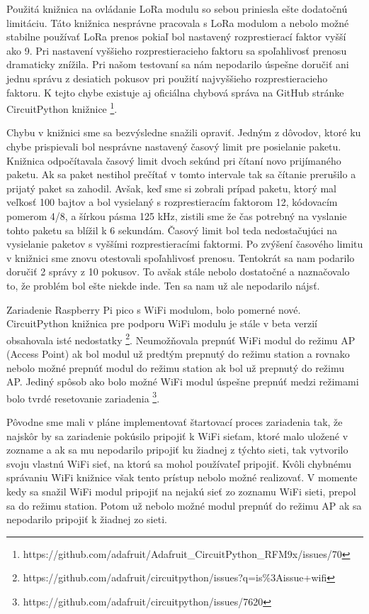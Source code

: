 \documentclass[slovak,master]{diploma}
\begin{document}
Použitá knižnica na ovládanie LoRa modulu so sebou priniesla ešte dodatočnú limitáciu. Táto knižnica nesprávne pracovala s LoRa modulom a nebolo možné stabilne používať 
LoRa prenos pokiaľ bol nastavený rozprestierací faktor vyšší ako 9. Pri nastavení vyššieho rozprestieracieho faktoru sa spoľahlivosť prenosu dramaticky znížila. Pri 
našom testovaní sa nám nepodarilo úspešne doručiť ani jednu správu z desiatich pokusov pri použití najvyššieho rozprestieracieho faktoru. 
K tejto chybe existuje aj oficiálna chybová správa na GitHub stránke CircuitPython knižnice \footnote[2]{https://github.com/adafruit/Adafruit\_CircuitPython\_RFM9x/issues/70}.

Chybu v knižnici sme sa bezvýsledne snažili opraviť. Jedným z dôvodov, ktoré ku chybe prispievali bol nesprávne nastavený časový limit pre posielanie paketu. Knižnica odpočítavala časový limit dvoch sekúnd 
pri čítaní novo prijímaného paketu. Ak sa paket nestihol prečítať v tomto intervale tak sa čítanie prerušilo a prijatý paket sa zahodil. 
Avšak, keď sme si zobrali prípad paketu, ktorý mal veľkosť 100 bajtov a bol vysielaný s rozprestieracím faktorom 12, kódovacím pomerom 4/8, a šírkou pásma 125 kHz, zistili sme 
že čas potrebný na vyslanie tohto paketu sa blížil k 6 sekundám. Časový limit bol teda nedostačujúci na vysielanie paketov s vyššími rozprestieracími faktormi. Po 
zvýšení časového limitu v knižnici sme znovu otestovali spoľahlivosť prenosu. Tentokrát sa nam podarilo doručiť 2 správy z 10 pokusov. To avšak stále nebolo dostatočné a 
naznačovalo to, že problém bol ešte niekde inde. Ten sa nam už ale nepodarilo nájsť.

Zariadenie Raspberry Pi pico s WiFi modulom, bolo pomerné nové. CircuitPython knižnica pre podporu WiFi modulu je stále v beta verzií obsahovala isté nedostatky \footnote[3]{https://github.com/adafruit/circuitpython/issues?q=is\%3Aissue+wifi}.
Neumožňovala prepnúť WiFi modul do režimu AP (Access Point) ak bol modul už predtým prepnutý do režimu station a rovnako nebolo možné prepnúť modul do režimu station ak bol 
už prepnutý do režimu AP. Jediný spôsob ako bolo možné WiFi modul úspešne prepnúť medzi režimami bolo tvrdé resetovanie zariadenia \footnote[4]{https://github.com/adafruit/circuitpython/issues/7620}.

Pôvodne sme mali v pláne implementovať štartovací proces zariadenia tak, že najskôr by sa zariadenie pokúsilo pripojiť k WiFi sieťam, ktoré malo uložené v zozname a ak sa mu nepodarilo 
pripojiť ku žiadnej z týchto sieti, tak vytvorilo svoju vlastnú WiFi sieť, na ktorú sa mohol používateľ pripojiť. Kvôli chybnému správaniu WiFi knižnice však tento prístup nebolo možné 
realizovať. V momente kedy sa snažil WiFi modul pripojiť na nejakú sieť zo zoznamu WiFi sieti, prepol sa do režimu station. Potom už nebolo možné modul prepnúť do režimu AP ak sa nepodarilo pripojiť 
k žiadnej zo sieti.
\end{document}
